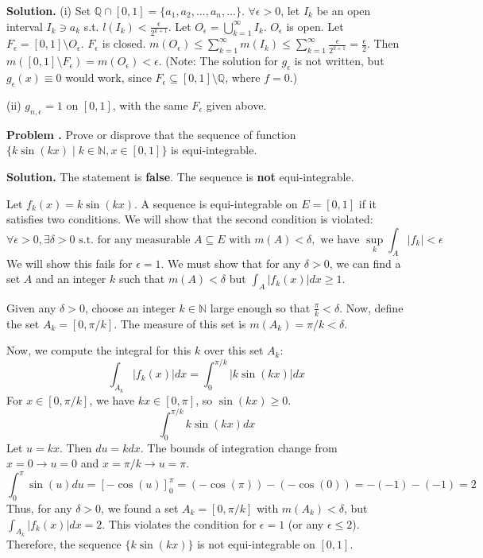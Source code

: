\documentclass[12pt, a4paper, oneside]{article}
\newcounter{problemname}
\newenvironment{problem}
  {\begin{shaded}\stepcounter{problemname}\par\noindent\textbf{Problem \arabic{problemname}.
}\newline}
  {\end{shaded}\par}
\newenvironment{solution}
  {\par\noindent\textbf{Solution. }\newline}
  {\par}
\begin{document}
\begin{solution}
(i) Set $\mathbb{Q} \cap [0,1] = \{a_1, a_2, ..., a_n, ...\}$.
$\forall \epsilon > 0$, let $I_k$ be an open interval $I_k \ni a_k$ s.t. $l(I_k) < \frac{\epsilon}{2^{k+1}}$.
Let $O_{\epsilon} = \bigcup_{k=1}^{\infty} I_k$. $O_\epsilon$ is open.
Let $F_{\epsilon} = [0,1] \setminus O_{\epsilon}$. $F_\epsilon$ is closed.
$m(O_\epsilon) \le \sum_{k=1}^\infty m(I_k) \le \sum_{k=1}^\infty \frac{\epsilon}{2^{k+1}} = \frac{\epsilon}{2}$.
Then $m([0,1] \setminus F_{\epsilon}) = m(O_\epsilon) < \epsilon$.
(Note: The solution for $g_\epsilon$ is not written, but $g_\epsilon(x) \equiv 0$ would work, since $F_\epsilon \subseteq [0,1] \setminus \mathbb{Q}$, where $f=0$.)

\noindent (ii) $g_{n,\epsilon} = 1$ on $[0,1]$, with the same $F_\epsilon$ given above.
\end{solution}

\begin{problem}
Prove or disprove that the sequence of function $\{k \sin(kx) \mid k \in \mathbb{N}, x \in [0,1]\}$ is equi-integrable.
\end{problem}

\begin{solution}
The statement is \textbf{false}. The sequence is \textbf{not} equi-integrable.

Let $f_k(x) = k \sin(kx)$. A sequence is equi-integrable on $E=[0,1]$ if it satisfies two conditions. We will show that the second condition is violated:
$$ \forall \epsilon > 0, \exists \delta > 0 \text{ s.t. for any measurable } A \subseteq E \text{ with } m(A) < \delta, \text{ we have } \sup_k \int_A |f_k| < \epsilon $$
We will show this fails for $\epsilon = 1$. We must show that for any $\delta > 0$, we can find a set $A$ and an integer $k$ such that $m(A) < \delta$ but $\int_A |f_k(x)| dx \ge 1$.

Given any $\delta > 0$, choose an integer $k \in \mathbb{N}$ large enough so that $\frac{\pi}{k} < \delta$.
Now, define the set $A_k = [0, \pi/k]$.
The measure of this set is $m(A_k) = \pi/k < \delta$.

Now, we compute the integral for this $k$ over this set $A_k$:
$$ \int_{A_k} |f_k(x)| dx = \int_0^{\pi/k} |k \sin(kx)| dx $$
For $x \in [0, \pi/k]$, we have $kx \in [0, \pi]$, so $\sin(kx) \ge 0$.
$$ \int_0^{\pi/k} k \sin(kx) dx $$
Let $u = kx$. Then $du = k dx$. The bounds of integration change from $x=0 \to u=0$ and $x=\pi/k \to u=\pi$.
$$ \int_0^\pi \sin(u) du = [-\cos(u)]_0^\pi = (-\cos(\pi)) - (-\cos(0)) = -(-1) - (-1) = 2 $$
Thus, for any $\delta > 0$, we found a set $A_k = [0, \pi/k]$ with $m(A_k) < \delta$, but $\int_{A_k} |f_k(x)| dx = 2$.
This violates the condition for $\epsilon = 1$ (or any $\epsilon \le 2$).
Therefore, the sequence $\{k \sin(kx)\}$ is not equi-integrable on $[0,1]$.
\end{solution}
\end{document}
